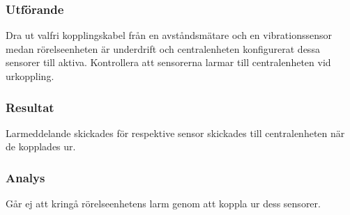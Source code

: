 \subsubsection*{Utförande}
Dra ut valfri kopplingskabel från en avståndsmätare och en vibrationssensor medan rörelseenheten är underdrift och centralenheten konfigurerat dessa sensorer till aktiva.
Kontrollera att sensorerna larmar till centralenheten vid urkoppling.


\subsubsection*{Resultat}
Larmeddelande skickades för respektive sensor skickades till centralenheten när de kopplades ur.


\subsubsection*{Analys}
Går ej att kringå rörelseenhetens larm genom att koppla ur dess sensorer.


